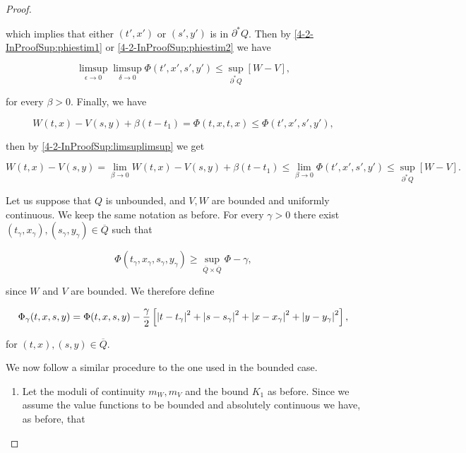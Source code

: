 \begin{proof}
\begin{enumerate}
        which implies that either $(t',x')$ or $(s',y')$ is in $\partial^{\ast}Q$. Then by \ref{4-2-InProofSup:phiestim1} 
        or \ref{4-2-InProofSup:phiestim2} we have

        \begin{equation}\label{4-2-InProofSup:limsuplimsup}
            \limsup_{\epsilon\to0}\limsup_{\delta\to0} \Phi(t',x',s',y') \leq \sup_{\partial^{\ast}Q}[W-V],
        \end{equation}

        for every $\beta>0$. Finally, we have

        \[W(t,x) - V(s,y) + \beta(t-t_1) = \Phi(t,x,t,x) \leq \Phi(t',x',s',y'),\]

        then by \ref{4-2-InProofSup:limsuplimsup} we get

        \[W(t,x) - V(s,y) = \lim_{\beta\to0}W(t,x) - V(s,y) + \beta(t-t_1)\leq \lim_{\beta\to0}\Phi(t',x',s',y')\leq \sup_{\partial^{\ast}Q}[W-V].\]
    \end{enumerate}

    Let us suppose that $Q$ is unbounded, and $V,W$ are bounded and uniformly continuous. We keep the same notation as before. For every $\gamma>0$ 
    there exist $(t_{\gamma},x_{\gamma}),(s_{\gamma},y_{\gamma})\in \overline{Q}$ such that
    
    \begin{equation}
        \Phi(t_{\gamma},x_{\gamma},s_{\gamma},y_{\gamma}) \geq \sup_{\overline{Q}\times\overline{Q}}\Phi - \gamma,
    \end{equation}

    since $W$ and $V$ are bounded. We therefore define

    \begin{equation}
        \Phi_{\gamma}(t,x,s,y) = \Phi(t,x,s,y) - \frac{\gamma}{2}\left[\abs{t-t_{\gamma}}^2+\abs{s-s_{\gamma}}^2 + \abs{x-x_{\gamma}}^2 + \abs{y-y_{\gamma}}^2\right],
    \end{equation}

    for $(t,x),(s,y)\in \overline{Q}$. 
    
    We now follow a similar procedure to the one used in the bounded case.

    \begin{enumerate}[label=\arabic*')]
        \item Let the moduli of continuity $m_W,m_V$ and the bound $K_1$ as before. Since we assume the value functions to be bounded and 
        absolutely continuous we have, as before, that
        

\end{enumerate}
\end{proof}

